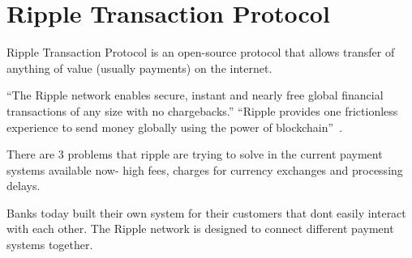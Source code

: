 \section{Ripple Transaction Protocol}

Ripple Transaction Protocol is an open-source protocol that allows transfer of anything of value (usually payments) on the internet.

``The Ripple network enables secure, instant and nearly free global financial transactions of any size with no chargebacks.'' \cite{hid-sp18-506-RippleNetwork} ``Ripple provides one frictionless experience to send money globally using the power of blockchain''~\cite{hid-sp18-506-GlobalPayment}.


There are 3 problems that ripple are trying to solve in the current payment systems
available now- high fees, charges for currency exchanges and processing delays. 

Banks today built their own system for their customers that dont easily interact with each other. The Ripple network is designed to connect different payment systems together.
